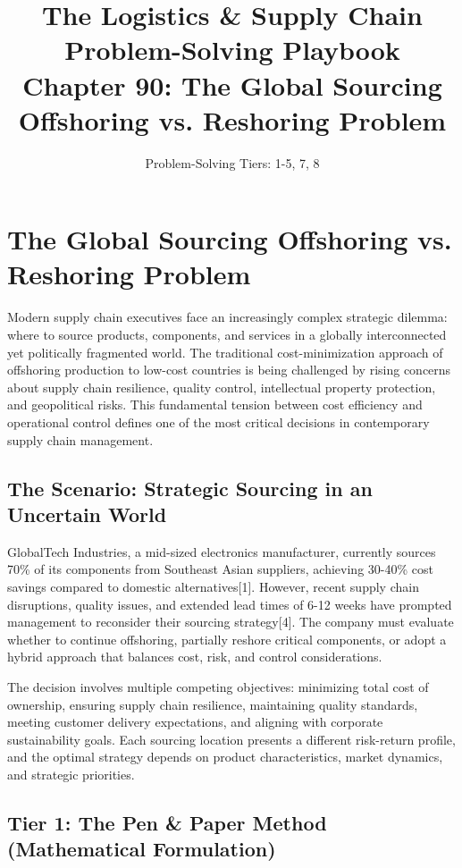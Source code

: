 \documentclass{article}
\title{The Logistics \& Supply Chain Problem-Solving Playbook\\
Chapter 90: The Global Sourcing Offshoring vs. Reshoring Problem}
\author{Problem-Solving Tiers: 1-5, 7, 8}
\date{}
\begin{document}
\maketitle

\section{The Global Sourcing Offshoring vs. Reshoring Problem}

Modern supply chain executives face an increasingly complex strategic dilemma: where to source products, components, and services in a globally interconnected yet politically fragmented world. The traditional cost-minimization approach of offshoring production to low-cost countries is being challenged by rising concerns about supply chain resilience, quality control, intellectual property protection, and geopolitical risks. This fundamental tension between cost efficiency and operational control defines one of the most critical decisions in contemporary supply chain management.

\subsection{The Scenario: Strategic Sourcing in an Uncertain World}

GlobalTech Industries, a mid-sized electronics manufacturer, currently sources 70\% of its components from Southeast Asian suppliers, achieving 30-40\% cost savings compared to domestic alternatives[1]. However, recent supply chain disruptions, quality issues, and extended lead times of 6-12 weeks have prompted management to reconsider their sourcing strategy[4]. The company must evaluate whether to continue offshoring, partially reshore critical components, or adopt a hybrid approach that balances cost, risk, and control considerations.

The decision involves multiple competing objectives: minimizing total cost of ownership, ensuring supply chain resilience, maintaining quality standards, meeting customer delivery expectations, and aligning with corporate sustainability goals. Each sourcing location presents a different risk-return profile, and the optimal strategy depends on product characteristics, market dynamics, and strategic priorities.

\subsection{Tier 1: The Pen \& Paper Method (Mathematical Formulation)}
\end{document}
